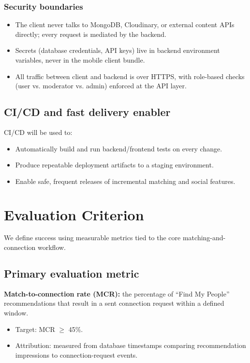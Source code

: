 \documentclass[11pt,a4paper]{article}
\begin{document}
\subsubsection*{Security boundaries}
\begin{itemize}[leftmargin=0.7cm]
    \item The client never talks to MongoDB, Cloudinary, or external content APIs directly; every request is mediated by the backend.
    \item Secrets (database credentials, API keys) live in backend environment variables, never in the mobile client bundle.
    \item All traffic between client and backend is over HTTPS, with role-based checks (user vs. moderator vs. admin) enforced at the API layer.
\end{itemize}

\subsection{CI/CD and fast delivery enabler}
CI/CD will be used to:
\begin{itemize}[leftmargin=0.7cm]
    \item Automatically build and run backend/frontend tests on every change.
    \item Produce repeatable deployment artifacts to a staging environment.
    \item Enable safe, frequent releases of incremental matching and social features.
\end{itemize}

\section{Evaluation Criterion}
We define success using measurable metrics tied to the core matching-and-connection workflow.

\subsection{Primary evaluation metric}
\textbf{Match-to-connection rate (MCR):} the percentage of ``Find My People'' recommendations that result in a sent connection request within a defined window.
\begin{itemize}[leftmargin=0.7cm]
    \item Target: MCR $\ge$ 45\%.
    \item Attribution: measured from database timestamps comparing recommendation impressions to connection-request events.
\end{itemize}
\end{document}
